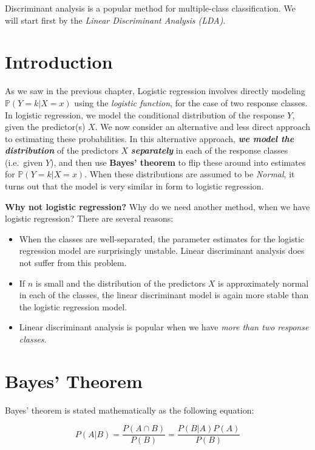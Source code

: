 \documentclass[]{book}
\providecommand{\tightlist}{%
  \setlength{\itemsep}{0pt}\setlength{\parskip}{0pt}}
\begin{document}
Discriminant analysis is a popular method for multiple-class
classiﬁcation. We will start first by the \emph{Linear Discriminant
Analysis (LDA)}.

\section{Introduction}\label{introduction-2}

As we saw in the previous chapter, Logistic regression involves directly
modeling \(\mathbb{P} (Y = k|X = x)\) using the \emph{logistic
function}, for the case of two response classes. In logistic regression,
we model the conditional distribution of the response \(Y\), given the
predictor(s) \(X\). We now consider an alternative and less direct
approach to estimating these probabilities. In this alternative
approach, \textbf{\emph{we model the distribution}} of the predictors
\(X\) \textbf{\emph{separately}} in each of the response classes
(i.e.~given \(Y\)), and then use \textbf{Bayes' theorem} to flip these
around into estimates for \(\mathbb{P} (Y = k|X = x)\). When these
distributions are assumed to be \emph{Normal}, it turns out that the
model is very similar in form to logistic regression.

\textbf{Why not logistic regression?} Why do we need another method,
when we have logistic regression? There are several reasons:

\begin{itemize}
\tightlist
\item
  When the classes are well-separated, the parameter estimates for the
  logistic regression model are surprisingly unstable. Linear
  discriminant analysis does not suﬀer from this problem.
\item
  If \(n\) is small and the distribution of the predictors \(X\) is
  approximately normal in each of the classes, the linear discriminant
  model is again more stable than the logistic regression model.
\item
  Linear discriminant analysis is popular when we have \emph{more than
  two response classes}.
\end{itemize}

\section{Bayes' Theorem}\label{bayes-theorem}

Bayes' theorem is stated mathematically as the following equation:

\[ P(A | B) = \frac{P(A \cap B)}{P(B)} =  \frac{P(B|A) P(A)}{P(B)}\]
\end{document}
